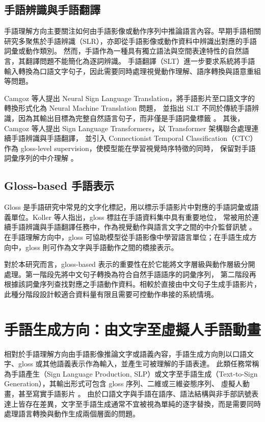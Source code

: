 \documentclass[class=NCU_thesis, crop=false]{standalone}
\begin{document}
\subsection{手語辨識與手語翻譯}
\label{subsec:slr_slt}

手語理解方向主要關注如何由手語影像或動作序列中推論語言內容。早期手語相關研究多聚焦於手語辨識（SLR），亦即從手語影像或動作資料中辨識出對應的手語詞彙或動作類別。
然而，手語作為一種具有獨立語法與空間表達特性的自然語言，其翻譯問題不能簡化為逐詞辨識。
手語翻譯（SLT）進一步要求系統將手語輸入轉換為口語文字句子，因此需要同時處理視覺動作理解、語序轉換與語意重組等問題。

Camgoz 等人提出 Neural Sign Language Translation，將手語影片至口語文字的轉換形式化為 Neural Machine Translation 問題，
並指出 SLT 不同於傳統手語辨識，因為其輸出目標為完整自然語言句子，而非僅是手語詞彙標籤 \cite{Camgoz_2018_CVPR}。
其後，Camgoz 等人提出 Sign Language Transformers，以 Transformer 架構聯合處理連續手語辨識與手語翻譯，
並引入 Connectionist Temporal Classification（CTC）作為 gloss-level supervision，使模型能在學習視覺時序特徵的同時，
保留對手語詞彙序列的中介理解 \cite{Camgoz_2020_CVPR}。

\subsection{Gloss-based 手語表示}
\label{subsec:gloss_based_representation}

Gloss 是手語研究中常見的文字化標記，用以標示手語影片中對應的手語詞彙或語義單位。Koller 等人指出，gloss 標註在手語資料集中具有重要地位，
常被用於連續手語辨識與手語翻譯任務中，作為視覺動作與語言文字之間的中介監督訊號 \cite{koller2020quantitative}。
在手語理解方向中，gloss 可協助模型從手語影像中學習語言單位；在手語生成方向中，gloss 則可作為文字與手語動作之間的橋接表示。

對於本研究而言，gloss-based 表示的重要性在於它能將文字層級與動作層級分開處理。第一階段先將中文句子轉換為符合自然手語語序的詞彙序列，
第二階段再根據該詞彙序列查找對應之手語動作資料。相較於直接由中文句子生成手語影片，此種分階段設計較適合資料量有限且需要可控動作串接的系統情境。

\section{手語生成方向：由文字至虛擬人手語動畫}
\label{sec:text_or_gloss_to_sign}

相對於手語理解方向由手語影像推論文字或語義內容，手語生成方向則以口語文字、gloss 或其他語義表示作為輸入，並產生可被理解的手語表達。
此類任務常稱為手語產生（Sign Language Production, SLP）或文字至手語生成（Text-to-Sign Generation），其輸出形式可包含 gloss 序列、二維或三維姿態序列、
虛擬人動畫，甚至寫實手語影片 \cite{rastgoo2024survey,saunders2020progressivetransformers,kim2022sign,Saunders2022signingatscale}。
由於口語文字與手語在語序、語法結構與非手部訊號表達上皆存在差異，文字至手語生成通常不宜被視為單純的逐字替換，而是需要同時處理語言轉換與動作生成兩個層面的問題。
\end{document}
